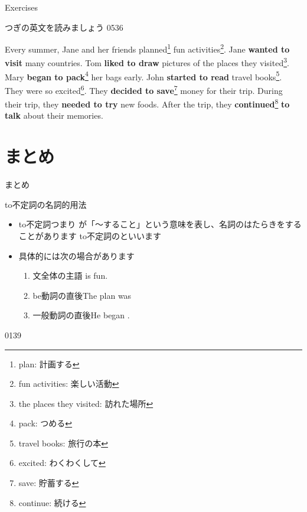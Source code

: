 \documentclass[aspectratio=169,xcolor={dvipsnames,table}]{beamer}
\begin{document}
\begin{frame}[plain]{Exercises}

{\small つぎの英文を読みましょう}%
\hfill{\tiny 0536}\,{\scriptsize {}}

Every summer, Jane and her friends planned\footnote{plan: 計画する} fun activities\footnote{fun activities: 楽しい活動}.
Jane {\bfseries wanted to visit} many countries.
Tom {\bfseries liked to draw} pictures of the places they visited\footnote{the places they visited: 訪れた場所}.
Mary {\bfseries began to pack}\footnote{pack: つめる} her bags early.
John {\bfseries started to read} travel books\footnote{travel books: 旅行の本}.
They were so excited\footnote{excited: わくわくして}.
They {\bfseries decided to save}\footnote{save: 貯蓄する} money for their trip.
During their trip, they {\bfseries needed to try} new foods.
After the trip, they { \bfseries continued}\footnote{continue: 続ける} {\bfseries to talk} about their memories.
\end{frame}
\section{まとめ}
\begin{frame}[plain]{まとめ}
 
\begin{block}{to不定詞の名詞的用法}
\begin{itemize}[square]\small
 \item  to不定詞つまり\,\,が「～すること」という意味を表し、名詞のはたらきをすることがあります%
 \hfill{}to不定詞のといいます
 \item 具体的には次の場合があります
      \begin{enumerate}[circle]
       \item 文全体の主語\hfill{\footnotesize {} is fun.}
       \item be動詞の直後\hfill{\footnotesize The plan was }
       \item 一般動詞の直後\hfill{\footnotesize He began .}
      \end{enumerate}
 \end{itemize}
     \end{block}

\hfill{\tiny 0139}\,{\scriptsize {}}
\end{frame}
\end{document}
